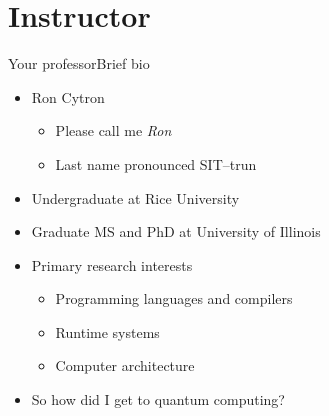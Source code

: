 \section{Instructor}
\begin{frame}{Your professor}{Brief bio}
\begin{itemize}
    \item Ron Cytron
    \begin{itemize}
        \item Please call me \emph{Ron}
        \item Last name pronounced SIT--trun
    \end{itemize}
    \item Undergraduate at Rice University
    \item Graduate MS and PhD at University of Illinois
    \item Primary research interests
    \begin{itemize}
        \item Programming languages and compilers
        \item Runtime systems
        \item Computer architecture
    \end{itemize}
    \item So how did I get to quantum computing?
\end{itemize}
    
\end{frame}

